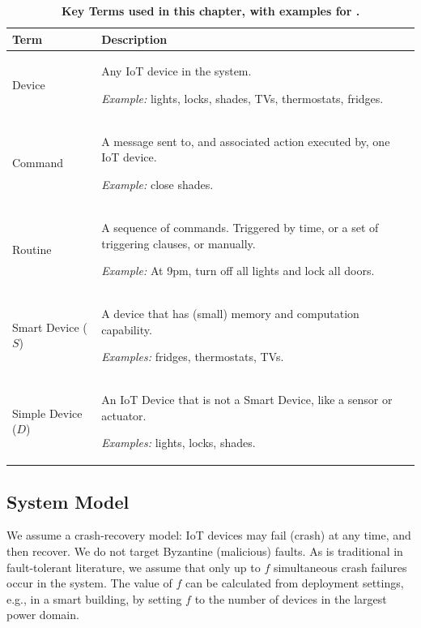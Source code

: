\begin{table}[t!]
    \centering
    \caption{\bf \small Key Terms used in this chapter, with examples for .}
    \bigskip
    \label{comesh:tab:terms}
    \small
    \renewcommand\arraystretch{1.1}
    \begin{tabular}{  m{3.5cm} m{12cm}  }
        \hline
        \strut \textbf{Term} & \textbf{Description} \\
        \hline\hline
        Device & Any IoT device in the system. \par \textit{Example:} lights, locks, shades, TVs, thermostats, fridges. \\
        \hline
        Command & A message sent to, and associated action executed by, one IoT 
        device. \par \textit{Example:} close shades. \\
        \hline
        Routine & A sequence of commands. Triggered by time, or a set of triggering clauses, or manually. \par \textit{Example:} At 9pm, turn off all lights and lock all doors. \\
        \hline
        Smart Device ($S$) & A device that has (small) memory and computation capability. \par \textit{Examples:} fridges, thermostats, TVs. \\
        \hline
        Simple Device ($D$) & An IoT Device that is not a Smart Device, like a sensor or actuator. \par \textit{Examples:} lights, locks, shades. \\
        \hline \hline
    \end{tabular}
\end{table}

\subsection{System Model}
\label{comesh:sec:system-model}

We assume a crash-recovery model: IoT devices may fail (crash) at any time, and then recover. We do not target Byzantine (malicious) faults. As is traditional in fault-tolerant literature, we assume that only up to $f$ simultaneous crash failures occur in the system. The value of $f$ can be calculated from deployment settings, e.g., in a smart building, by setting $f$ to the number of devices in the largest power domain. 

